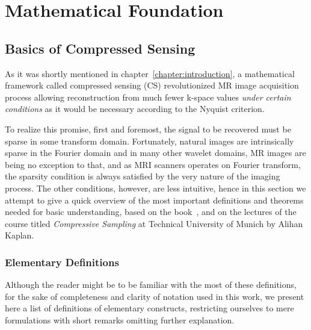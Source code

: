 \chapter{Mathematical Foundation}

\section{Basics of Compressed Sensing}
As it was shortly mentioned in chapter~\ref{chapter:introduction}, a mathematical framework called compressed sensing (CS) revolutionized MR image acquisition process allowing reconstruction from much fewer k-space values \textit{under certain conditions} as it would be necessary according to the Nyquist criterion.

To realize this promise, first and foremost, the signal to be recovered must be sparse in some transform domain. Fortunately, natural images are intrinsically sparse in the Fourier domain and in many other wavelet domains, MR images are being no exception to that, and as MRI scanners operates on Fourier transform, the sparsity condition is always satisfied by the very nature of the imaging process. The other conditions, however, are less intuitive, hence in this section we attempt to give a quick overview of the most important definitions and theorems needed for basic understanding, based on the book~\cite{foucart_mathematical_2013}, and on the lectures of the course titled \textit{Compressive Sampling} at Technical University of Munich by Alihan Kaplan.

\subsection{Elementary Definitions}

Although the reader might be to be familiar with the most of these definitions, for the sake of completeness and clarity of notation used in this work, we present here a list of definitions of elementary constructs, restricting ourselves to mere formulations with short remarks omitting further explanation.

